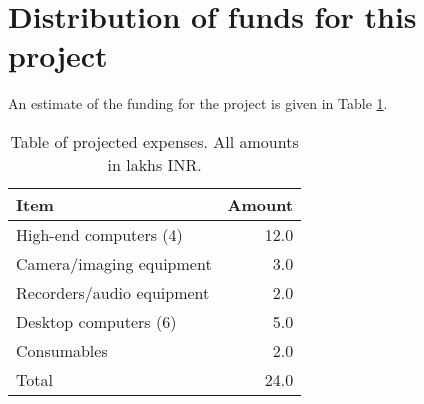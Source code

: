 \documentclass{article}
\begin{document}
\section{Distribution of funds for this project}

An estimate of the funding for the project is given in Table \ref{tab:funding}.

\begin{table}[th]
\centering
\caption{Table of projected expenses. All amounts in lakhs INR.}
\begin{tabular}{|l|r|}
\hline
Item & Amount \\
\hline
High-end computers (4) & 12.0 \\
Camera/imaging equipment & 3.0 \\
Recorders/audio equipment & 2.0 \\
Desktop computers (6) & 5.0 \\
Consumables & 2.0 \\
\hline
Total & 24.0 \\
\hline
\end{tabular}
\label{tab:funding}
\end{table}
\end{document}
